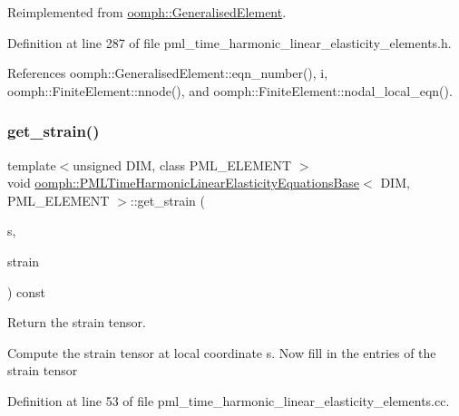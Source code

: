 Reimplemented from \hyperlink{classoomph_1_1GeneralisedElement_a069f59bfc3e607a5bebba52c6314d777}{oomph\+::\+Generalised\+Element}.



Definition at line 287 of file pml\+\_\+time\+\_\+harmonic\+\_\+linear\+\_\+elasticity\+\_\+elements.\+h.



References oomph\+::\+Generalised\+Element\+::eqn\+\_\+number(), i, oomph\+::\+Finite\+Element\+::nnode(), and oomph\+::\+Finite\+Element\+::nodal\+\_\+local\+\_\+eqn().

\mbox{\label{classoomph_1_1PMLTimeHarmonicLinearElasticityEquationsBase_a3f9212801628695a4babc5f0b3579bc1}} 
\subsubsection{\texorpdfstring{get\+\_\+strain()}{get\_strain()}}
{\footnotesize\ttfamily template$<$unsigned D\+IM, class P\+M\+L\+\_\+\+E\+L\+E\+M\+E\+NT $>$ \\
void \hyperlink{classoomph_1_1PMLTimeHarmonicLinearElasticityEquationsBase}{oomph\+::\+P\+M\+L\+Time\+Harmonic\+Linear\+Elasticity\+Equations\+Base}$<$ D\+IM, P\+M\+L\+\_\+\+E\+L\+E\+M\+E\+NT $>$\+::get\+\_\+strain (\begin{DoxyParamCaption}\item[{const \hyperlink{classoomph_1_1Vector}{Vector}$<$ double $>$ \&}]{s,  }\item[{\hyperlink{classoomph_1_1DenseMatrix}{Dense\+Matrix}$<$ std\+::complex$<$ double $>$ $>$ \&}]{strain }\end{DoxyParamCaption}) const}



Return the strain tensor. 

Compute the strain tensor at local coordinate s. Now fill in the entries of the strain tensor 

Definition at line 53 of file pml\+\_\+time\+\_\+harmonic\+\_\+linear\+\_\+elasticity\+\_\+elements.\+cc.



